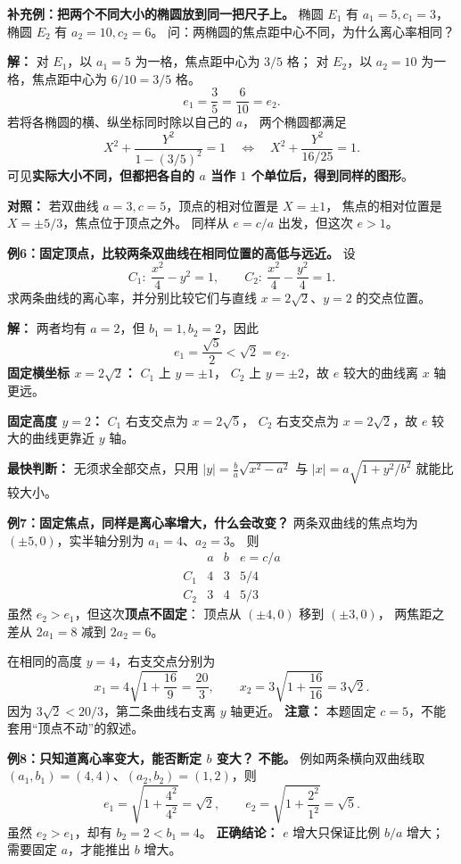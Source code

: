 \begin{examplebox}
\textbf{补充例：把两个不同大小的椭圆放到同一把尺子上。}
椭圆 $E_1$ 有 $a_1=5,c_1=3$，椭圆 $E_2$ 有 $a_2=10,c_2=6$。
问：两椭圆的焦点距中心不同，为什么离心率相同？

\textbf{解：} 对 $E_1$，以 $a_1=5$ 为一格，焦点距中心为 $3/5$ 格；
对 $E_2$，以 $a_2=10$ 为一格，焦点距中心为 $6/10=3/5$ 格。
\[
\boxed{e_1=\frac35=\frac6{10}=e_2.}
\]
若将各椭圆的横、纵坐标同时除以自己的 $a$，
两个椭圆都满足
\[
 X^2+\frac{Y^2}{1-(3/5)^2}=1
 \quad\Longleftrightarrow\quad
 \boxed{X^2+\frac{Y^2}{16/25}=1}.
\]
可见\textbf{实际大小不同，但都把各自的 $a$ 当作 $1$ 个单位后，得到同样的图形}。

\medskip
\textbf{对照：} 若双曲线 $a=3,c=5$，顶点的相对位置是 $X=\pm1$，
焦点的相对位置是 $X=\pm5/3$，焦点位于顶点之外。
同样从 $e=c/a$ 出发，但这次 $e>1$。
\end{examplebox}
\clearpage



\begin{examplebox}
\textbf{例6：固定顶点，比较两条双曲线在相同位置的高低与远近。}
设
\[
 C_1:\ \frac{x^2}{4}-y^2=1,\qquad
 C_2:\ \frac{x^2}{4}-\frac{y^2}{4}=1.
\]
求两条曲线的离心率，并分别比较它们与直线
$x=2\sqrt2$、$y=2$ 的交点位置。

\textbf{解：} 两者均有 $a=2$，但 $b_1=1,b_2=2$，因此
\[
 e_1=\frac{\sqrt5}{2}<\sqrt2=e_2.
\]
\textbf{固定横坐标 $x=2\sqrt2$：} $C_1$ 上 $y=\pm1$，
$C_2$ 上 $y=\pm2$，故 $e$ 较大的曲线离 $x$ 轴更远。

\textbf{固定高度 $y=2$：} $C_1$ 右支交点为 $x=2\sqrt5$，
$C_2$ 右支交点为 $x=2\sqrt2$，故 $e$ 较大的曲线更靠近 $y$ 轴。

\textbf{最快判断：} 无须求全部交点，只用
$|y|=\frac ba\sqrt{x^2-a^2}$ 与
$|x|=a\sqrt{1+y^2/b^2}$ 就能比较大小。
\end{examplebox}
\clearpage

\begin{examplebox}
\textbf{例7：固定焦点，同样是离心率增大，什么会改变？}
两条双曲线的焦点均为 $(\pm5,0)$，实半轴分别为 $a_1=4$、$a_2=3$。
则
\[
 \begin{array}{c|ccc}
   &a&b& e=c/a\\\hline
 C_1&4&3&5/4\\
 C_2&3&4&5/3
 \end{array}
\]
虽然 $e_2>e_1$，但这次\textbf{顶点不固定}：
顶点从 $(\pm4,0)$ 移到 $(\pm3,0)$，
两焦距之差从 $2a_1=8$ 减到 $2a_2=6$。

在相同的高度 $y=4$，右支交点分别为
\[
 x_1=4\sqrt{1+\frac{16}{9}}=\frac{20}{3},\qquad
 x_2=3\sqrt{1+\frac{16}{16}}=3\sqrt2.
\]
因为 $3\sqrt2<20/3$，第二条曲线右支离 $y$ 轴更近。
\textbf{注意：} 本题固定 $c=5$，不能套用“顶点不动”的叙述。

\medskip
\textbf{例8：只知道离心率变大，能否断定 $b$ 变大？}
\textbf{不能。} 例如两条横向双曲线取
$(a_1,b_1)=(4,4)$、$(a_2,b_2)=(1,2)$，则
\[
 e_1=\sqrt{1+\frac{4^2}{4^2}}=\sqrt2,
 \qquad e_2=\sqrt{1+\frac{2^2}{1^2}}=\sqrt5.
\]
虽然 $e_2>e_1$，却有 $b_2=2<b_1=4$。
\textbf{正确结论：} $e$ 增大只保证比例 $b/a$ 增大；
需要固定 $a$，才能推出 $b$ 增大。
\end{examplebox}
\clearpage
